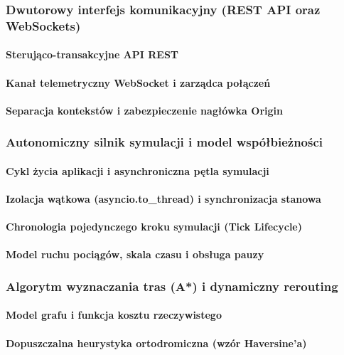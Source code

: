 \documentclass[twoside]{projektInzynierskiMS1z}
\begin{document}
\subsubsection{Dwutorowy interfejs komunikacyjny (REST API oraz WebSockets)}
    \paragraph{Sterująco-transakcyjne API REST}
    \paragraph{Kanał telemetryczny WebSocket i zarządca połączeń}
    \paragraph{Separacja kontekstów i zabezpieczenie nagłówka Origin}
\subsubsection{Autonomiczny silnik symulacji i model współbieżności}
    \paragraph{Cykl życia aplikacji i asynchroniczna pętla symulacji}
    \paragraph{Izolacja wątkowa (asyncio.to\_thread) i synchronizacja stanowa}
    \paragraph{Chronologia pojedynczego kroku symulacji (Tick Lifecycle)}
    \paragraph{Model ruchu pociągów, skala czasu i obsługa pauzy}
\subsubsection{Algorytm wyznaczania tras (A*) i dynamiczny rerouting}
    \paragraph{Model grafu i funkcja kosztu rzeczywistego}
    \paragraph{Dopuszczalna heurystyka ortodromiczna (wzór Haversine'a)}
\end{document}
